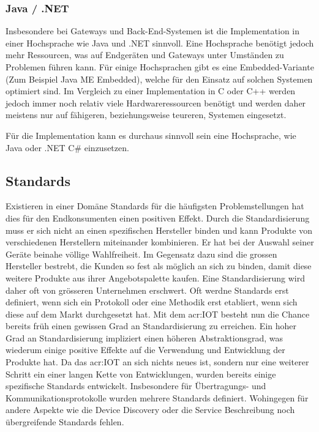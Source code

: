 \subsubsection{Java / .NET}
Insbesondere bei Gateways und Back-End-Systemen ist die Implementation in einer Hochsprache wie Java und .NET sinnvoll.
Eine Hochsprache benötigt jedoch mehr Ressourcen, was auf Endgeräten und Gateways unter Umständen zu Problemen führen kann. Für einige Hochsprachen gibt es eine Embedded-Variante (Zum Beispiel Java ME Embedded), welche für den Einsatz auf solchen Systemen optimiert sind. Im Vergleich zu einer Implementation in C oder C++ werden jedoch immer noch relativ viele Hardwareressourcen benötigt und werden daher meistens nur auf fähigeren, beziehungsweise teureren, Systemen eingesetzt.

Für die Implementation kann es durchaus sinnvoll sein eine Hochsprache, wie Java oder .NET C\# einzusetzen. 



\subsection{Standards}
Existieren in einer Domäne Standards für die häufigsten Problemstellungen hat dies für den Endkonsumenten einen positiven Effekt. Durch die Standardisierung muss er sich nicht an einen spezifischen Hersteller binden und kann Produkte von verschiedenen Herstellern miteinander kombinieren. Er hat bei der Auswahl seiner Geräte beinahe völlige Wahlfreiheit. Im Gegensatz dazu sind die grossen Hersteller bestrebt, die Kunden so fest als möglich an sich zu binden, damit diese weitere Produkte aus ihrer Angebotspalette kaufen. Eine Standardisierung wird daher oft von grösseren Unternehmen erschwert. Oft werdne Standards erst definiert, wenn sich ein Protokoll oder eine Methodik erst etabliert, wenn sich diese auf dem Markt durchgesetzt hat. Mit dem \gls{acr:IOT} besteht nun die Chance bereits früh einen gewissen Grad an Standardisierung zu erreichen. Ein hoher Grad an Standardisierung impliziert einen höheren Abstraktionsgrad, was wiederum einige positive Effekte auf die Verwendung und Entwicklung der Produkte hat. Da das \gls{acr:IOT} an sich nichts neues ist, sondern nur eine weiterer Schritt ein einer langen Kette von Entwicklungen, wurden bereits einige spezifische Standards entwickelt. Insbesondere für Übertragungs- und Kommunikationsprotokolle wurden mehrere Standards definiert. Wohingegen für andere Aspekte wie die Device Discovery oder die Service Beschreibung noch übergreifende Standards fehlen.
 

